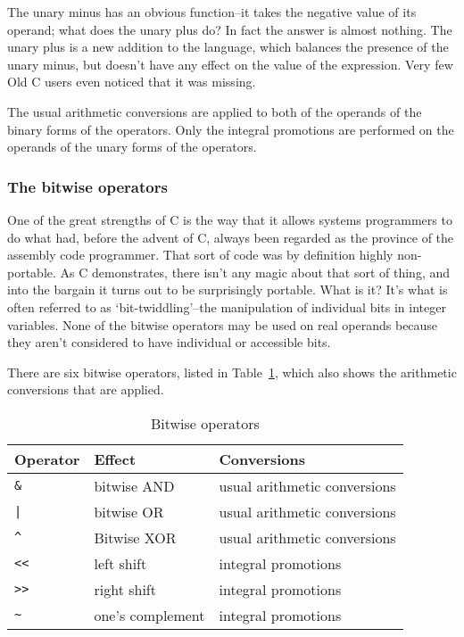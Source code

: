     The unary minus has an obvious function--it takes the negative
     value of its operand; what does the unary plus do? In fact the answer is
     almost nothing. The unary plus is a new addition to the language, which
     balances the presence of the unary minus, but doesn't have any effect on
     the value of the expression. Very few Old C users even noticed that
     it was missing.


    The usual arithmetic conversions are applied to both of the operands of
     the binary forms of the operators. Only the integral promotions are
     performed on the operands of the unary forms of the operators.


   

   \subsubsection{The bitwise operators}
    

    One of the great strengths of C is the way that it allows systems
     programmers to do what had, before the advent of C, always been
     regarded as the province of the assembly code programmer. That sort of
     code was by definition highly non-portable. As C demonstrates, there
     isn't any magic about that sort of thing, and into the bargain it turns
     out to be surprisingly portable. What is it? It's what is often referred
     to as `bit-twiddling'--the manipulation of individual bits in
     integer variables. None of the bitwise operators may be used on real
     operands because they aren't considered to have individual or accessible
     bits.


    There are six bitwise operators, listed in Table~\ref{tab:bitwiseOps},
     which also shows the arithmetic conversions that are applied.


     \begin{table}[htb]
       \centering
       \begin{tabular}{lll}
         \toprule
         Operator    & Effect           & Conversions     \\
         \midrule
         \texttt{\&} & bitwise AND      & usual arithmetic conversions     \\
         \texttt{|}  & bitwise OR       & usual arithmetic conversions     \\
         \texttt{\^} & Bitwise XOR      & usual arithmetic conversions     \\
         \texttt{<{}<} & left shift       & integral promotions     \\
         \texttt{>{}>} & right shift      & integral promotions     \\
         \texttt{\~} & one's complement & integral promotions     \\
         \bottomrule
       \end{tabular}
       \caption{\label{tab:bitwiseOps}Bitwise operators}
     \end{table}


